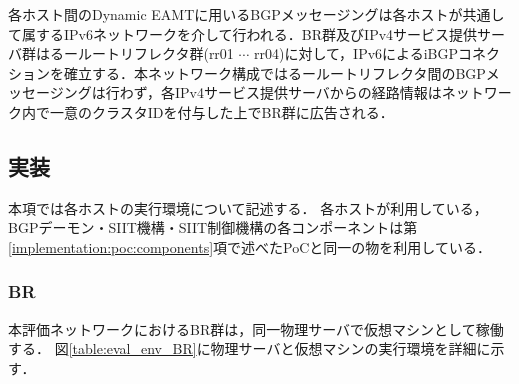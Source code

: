 各ホスト間のDynamic EAMTに用いるBGPメッセージングは各ホストが共通して属するIPv6ネットワークを介して行われる．BR群及びIPv4サービス提供サーバ群はるールートリフレクタ群(rr01 $\cdots$ rr04)に対して，IPv6によるiBGPコネクションを確立する．本ネットワーク構成ではるールートリフレクタ間のBGPメッセージングは行わず，各IPv4サービス提供サーバからの経路情報はネットワーク内で一意のクラスタIDを付与した上でBR群に広告される．

\subsection{実装}
本項では各ホストの実行環境について記述する．
各ホストが利用している，BGPデーモン・SIIT機構・SIIT制御機構の各コンポーネントは第\ref{implementation:poc:components}項で述べたPoCと同一の物を利用している．


\subsubsection{BR}
本評価ネットワークにおけるBR群は，同一物理サーバで仮想マシンとして稼働する．
図\ref{table:eval_env_BR}に物理サーバと仮想マシンの実行環境を詳細に示す．


\begin{table}[h]
    \label{table:eval_env_BR}
    \caption{評価実験用BR群の実行環境}
\end{table}

